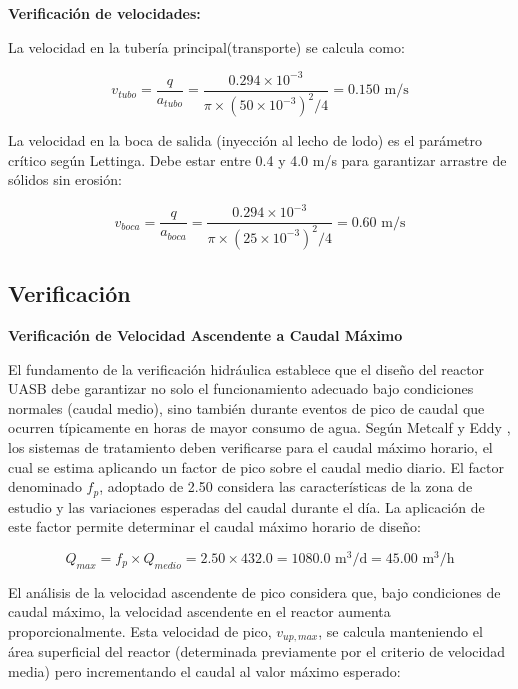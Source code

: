 \documentclass[12pt,a4paper]{article}
\begin{document}
\textbf{Verificación de velocidades:}

La velocidad en la tubería principal(transporte) se calcula como:

\begin{equation}
v_{tubo} = \frac{q}{a_{tubo}} = \frac{0.294 \times 10^{-3}}{\pi \times (50 \times 10^{-3})^2 / 4} = 0.150 \text{ m/s}
\end{equation}

La velocidad en la boca de salida (inyección al lecho de lodo) es el parámetro crítico según Lettinga. Debe estar entre 0.4 y 4.0 m/s para garantizar arrastre de sólidos sin erosión:

\begin{equation}
v_{boca} = \frac{q}{a_{boca}} = \frac{0.294 \times 10^{-3}}{\pi \times (25 \times 10^{-3})^2 / 4} = 0.60 \text{ m/s}
\end{equation}

\subsection{Verificación}

\textbf{Verificación de Velocidad Ascendente a Caudal Máximo}

El fundamento de la verificación hidráulica establece que el diseño del reactor UASB debe garantizar no solo el funcionamiento adecuado bajo condiciones normales (caudal medio), sino también durante eventos de pico de caudal que ocurren típicamente en horas de mayor consumo de agua. Según Metcalf y Eddy \cite{metcalf2014}, los sistemas de tratamiento deben verificarse para el caudal máximo horario, el cual se estima aplicando un factor de pico sobre el caudal medio diario. El factor denominado $f_p$, adoptado de 2.50 considera las características de la zona de estudio y las variaciones esperadas del caudal durante el día. La aplicación de este factor permite determinar el caudal máximo horario de diseño:

\begin{equation}
Q_{max} = f_p \times Q_{medio} = 2.50 \times 432.0 = 1080.0 \text{ m}^3\text{/d} = 45.00 \text{ m}^3\text{/h}
\end{equation}

El análisis de la velocidad ascendente de pico considera que, bajo condiciones de caudal máximo, la velocidad ascendente en el reactor aumenta proporcionalmente. Esta velocidad de pico, $v_{up,max}$, se calcula manteniendo el área superficial del reactor (determinada previamente por el criterio de velocidad media) pero incrementando el caudal al valor máximo esperado:
\end{document}
